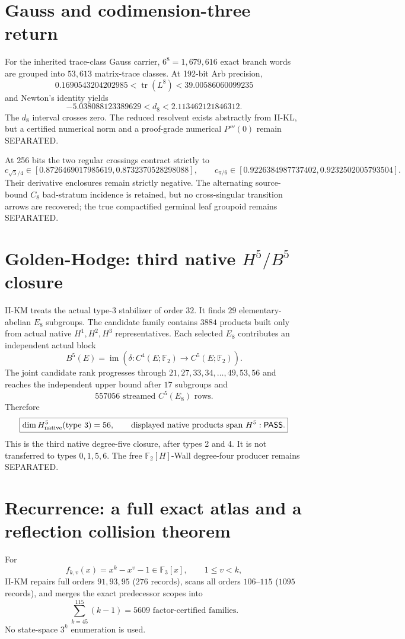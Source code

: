 \documentclass[9.5pt,a4paper]{article}
\newcommand{\PASS}{\textsf{PASS}}\newcommand{\ZERO}{\textsf{ZERO}}\newcommand{\SEP}{\textsf{SEPARATED}}\newcommand{\REF}{\textsf{REFUTED}}\newcommand{\NT}{\textsf{NT}}
\begin{document}
\section{Gauss and codimension-three return}
For the inherited trace-class Gauss carrier, $6^8=1{,}679{,}616$ exact branch words are grouped into $53{,}613$ matrix-trace classes.  At 192-bit Arb precision,
\[
\boxed{0.1690543204202985<\operatorname{tr}(L^8)<39.00586060099235}
\]
and Newton's identity yields
\[
\boxed{-5.038088123389629<d_8<2.113462121846312.}
\]
The $d_8$ interval crosses zero.  The reduced resolvent exists abstractly from II-KL, but a certified numerical norm and a proof-grade numerical $P'''(0)$ remain \SEP.

At 256 bits the two regular crossings contract strictly to
\[
\boxed{c_{\sqrt5/4}\in[0.8726469017985619,0.8732370528298088]},\qquad
\boxed{c_{\pi/6}\in[0.9226384987737402,0.9232502005793504]}.
\]
Their derivative enclosures remain strictly negative.  The alternating source-bound $C_8$ bad-stratum incidence is retained, but no cross-singular transition arrows are recovered; the true compactified germinal leaf groupoid remains \SEP.

\section{Golden-Hodge: third native $H^5/B^5$ closure}
II-KM treats the actual type-3 stabilizer of order $32$.  It finds $29$ elementary-abelian $E_8$ subgroups.  The candidate family contains $3884$ products built only from actual native $H^1,H^2,H^3$ representatives.  Each selected $E_8$ contributes an independent actual block
\[
B^5(E)=\operatorname{im}(\delta:C^4(E;\mathbb F_2)\to C^5(E;\mathbb F_2)).
\]
The joint candidate rank progresses through $21,27,33,34,\ldots,49,53,56$ and reaches the independent upper bound after $17$ subgroups and
\[
\boxed{557056\text{ streamed }C^5(E_8)\text{ rows}.}
\]
Therefore
\[
\boxed{\dim H^5_{\rm native}(\text{type }3)=56,\qquad\text{displayed native products span }H^5:\PASS.}
\]
This is the third native degree-five closure, after types 2 and 4.  It is not transferred to types $0,1,5,6$.  The free $\mathbb F_2[H]$-Wall degree-four producer remains \SEP.

\section{Recurrence: a full exact atlas and a reflection collision theorem}
For
\[
f_{k,v}(x)=x^k-x^v-1\in\mathbb F_3[x],\qquad 1\le v<k,
\]
II-KM repairs full orders $91,93,95$ ($276$ records), scans all orders $106$--$115$ ($1095$ records), and merges the exact predecessor scopes into
\[
\boxed{\sum_{k=45}^{115}(k-1)=5609\text{ factor-certified families}.}
\]
No state-space $3^k$ enumeration is used.
\end{document}
